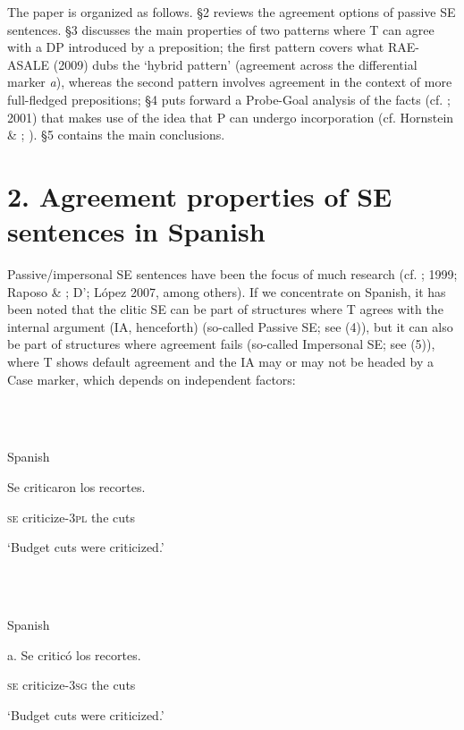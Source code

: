 \documentclass[output=paper]{langsci/langscibook}
\begin{document}
  The paper is organized as follows. §2 reviews the agreement options of passive SE sentences. §3 discusses the main properties of two patterns where T can agree with a DP introduced by a preposition; the first pattern covers what RAE-ASALE (2009) dubs the ‘hybrid pattern’ (agreement across the differential marker \textit{a}), whereas the second pattern involves agreement in the context of more full-fledged prepositions; §4 puts forward a Probe-Goal analysis of the facts (cf. \citealt{Chomsky2000}; 2001) that makes use of the idea that P can undergo incorporation (cf. Hornstein \& \citealt{Weinberg1981}; \citealt{Law2006}). §5 contains the main conclusions.

\section{ 2. Agreement properties of SE sentences in Spanish}

Passive/impersonal SE sentences have been the focus of much research (cf. \citealt{Mendikoetxea1992}; 1999; Raposo \& \citealt{Uriagereka1996}; D’\citealt{Alessandro2007}; López 2007, among others). If we concentrate on Spanish, it has been noted that the clitic SE can be part of structures where T agrees with the internal argument (IA, henceforth) (so-called Passive SE; see (4)), but it can also be part of structures where agreement fails (so-called Impersonal SE; see (5)), where T shows default agreement and the IA may or may not be headed by a Case marker, which depends on independent factors:

\ea%
    \label{ex:key:4}
    \gll\\
        \\
    \glt
    \z

          Spanish

Se  criticaron        los recortes.        

  \textsc{se} criticize-\textsc{3pl}  the cuts

           ‘Budget cuts were criticized.’

\ea%
    \label{ex:key:5}
    \gll\\
        \\
    \glt
    \z

          Spanish

a.  Se   criticó             los  recortes.      

        \textsc{se}  criticize-\textsc{3sg}  the  cuts

                  ‘Budget cuts were criticized.’
\end{document}
